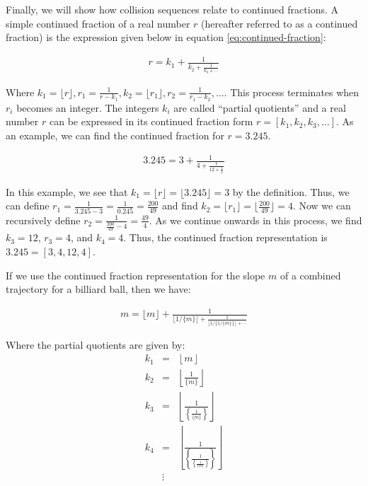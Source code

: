 Finally, we will show how collision sequences relate to continued fractions. A simple continued fraction of a real number $r$ (hereafter referred to as a continued fraction) is the expression given below in equation \ref{eq:continued-fraction}:

\begin{eqnarray}
  \label{eq:continued-fraction}
  r = k_1 + \frac{1}{k_2 + \frac{1}{k_3 + \cdots}}
\end{eqnarray}

Where $k_1 = \lfloor r \rfloor, r_1 = \frac{1}{r-k_1}, k_2=\lfloor r_1 \rfloor, r_2 = \frac{1}{r_1-k_2}, \ldots$. This process terminates when $r_i$ becomes an integer. The integers $k_i$ are called ``partial quotients'' and a real number $r$ can be expressed in its continued fraction form $r = [k_1, k_2, k_3, \ldots]$. As an example, we can find the continued fraction for $r = 3.245$.

\begin{example}
  \begin{eqnarray}
    3.245 = 3 + \frac{1}{4 + \frac{1}{12 + \frac{1}{4}}}
  \end{eqnarray}

In this example, we see that $k_1 = \lfloor r \rfloor = \lfloor 3.245 \rfloor = 3$ by the definition. Thus, we can define $r_1 = \frac{1}{3.245 - 3} = \frac{1}{0.245} = \frac{200}{49}$ and find $k_2 = \lfloor r_1 \rfloor = \lfloor \frac{200}{49} \rfloor = 4$. Now we can recursively define $r_2 = \frac{1}{\frac{200}{49} - 4} = \frac{49}{4}$. As we continue onwards in this process, we find $k_3 = 12$, $r_3 = 4$, and $k_4 = 4$. Thus, the continued fraction representation is $3.245 = [3,4,12,4]$.
\end{example}

If we use the continued fraction representation for the slope $m$ of a combined trajectory for a billiard ball, then we have:

\begin{eqnarray}
m = \lfloor m \rfloor + \frac{1}{\lfloor 1 / \{m\} \rfloor + \frac{1}{\lfloor 1/\{1/\{m\}\} \rfloor + \cdots}}
\end{eqnarray}

Where the partial quotients are given by:
\begin{eqnarray*}
  k_1 &=& \left\lfloor m \right\rfloor \\
  k_2 &=& \left\lfloor \frac{1}{\{m\}} \right\rfloor \\
  k_3 &=& \left\lfloor \frac{1}{\left\{ \frac{1}{\{m\}} \right\}} \right\rfloor \\
  k_4 &=& \left\lfloor \frac{1}{\left\{ \frac{1}{\left\{\frac{1}{\{m\}}\right\}} \right\}} \right\rfloor \\
      &\vdots& \\
\end{eqnarray*}

